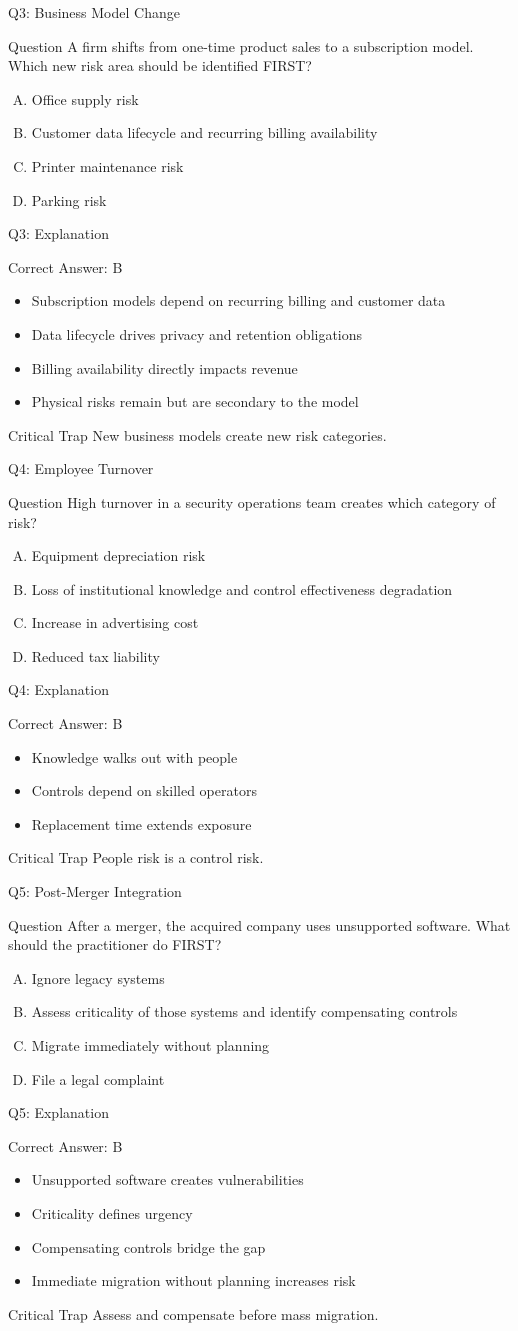\documentclass[aspectratio=169]{beamer}
\newcommand{\hq}[7]{%
	\begin{frame}{Q#1: #2}
		\begin{block}{Question}
			#3
		\end{block}
		\begin{enumerate}[(A)]
			#4
		\end{enumerate}
	\end{frame}
	\begin{frame}{Q#1: Explanation}
		\begin{block}{Correct Answer: #5}
			\begin{itemize}
				#6
			\end{itemize}
		\end{block}
		\begin{alertblock}{Critical Trap}
			#7
		\end{alertblock}
	\end{frame}
}
\begin{document}
	\hq{3}{Business Model Change}
	{A firm shifts from one-time product sales to a subscription model. Which new risk area should be identified FIRST?}
	{\item Office supply risk
		\item Customer data lifecycle and recurring billing availability
		\item Printer maintenance risk
		\item Parking risk}
	{B}
	{\item Subscription models depend on recurring billing and customer data
		\item Data lifecycle drives privacy and retention obligations
		\item Billing availability directly impacts revenue
		\item Physical risks remain but are secondary to the model}
	{New business models create new risk categories.}
	
	\hq{4}{Employee Turnover}
	{High turnover in a security operations team creates which category of risk?}
	{\item Equipment depreciation risk
		\item Loss of institutional knowledge and control effectiveness degradation
		\item Increase in advertising cost
		\item Reduced tax liability}
	{B}
	{\item Knowledge walks out with people
		\item Controls depend on skilled operators
		\item Replacement time extends exposure}
	{People risk is a control risk.}
	
	\hq{5}{Post-Merger Integration}
	{After a merger, the acquired company uses unsupported software. What should the practitioner do FIRST?}
	{\item Ignore legacy systems
		\item Assess criticality of those systems and identify compensating controls
		\item Migrate immediately without planning
		\item File a legal complaint}
	{B}
	{\item Unsupported software creates vulnerabilities
		\item Criticality defines urgency
		\item Compensating controls bridge the gap
		\item Immediate migration without planning increases risk}
	{Assess and compensate before mass migration.}
	
\end{document}
